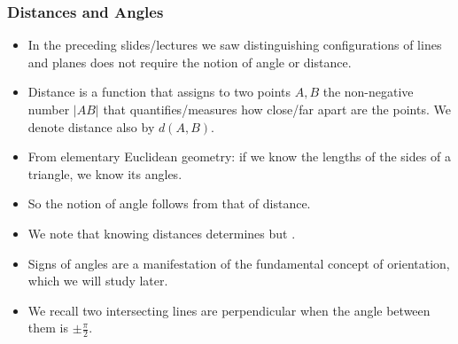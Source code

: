 \begin{frame}
\frametitle{Distances and Angles}
\begin{itemize}
\item In the preceding slides/lectures we saw distinguishing configurations of lines and planes does not require the notion of angle or distance. 
\item<3-> Distance is a function that assigns to two points $A,B$ the non-negative number $|AB|$ that quantifies/measures how close/far apart are the points. We denote distance also by $d(A,B)$.
\item<4-> From elementary Euclidean geometry: if we know the lengths of the sides of a triangle, we know  its angles.
\item<5-> So the notion of  angle follows from that of distance.
\item<6-> We note that knowing distances determines  but .
\item<7-> Signs of angles are a manifestation of the fundamental concept of orientation, which we will study later.
\item<8-> We recall two intersecting lines are perpendicular when the angle between them is $\pm \frac{\pi}{2}$.
\end{itemize}

\end{frame}
